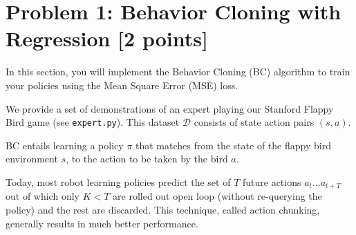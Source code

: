 \documentclass[12pt]{article}
\begin{document}
\section*{Problem 1: Behavior Cloning with Regression [2 points]}

In this section, you will implement the Behavior Cloning (BC) algorithm to train your policies using the Mean Square Error (MSE) loss.

We provide a set of demonstrations of an expert playing our Stanford Flappy Bird game (see \texttt{expert.py}). This dataset $\mathcal{D}$ consists of state action pairs $(s, a)$.

BC entails learning a policy $\pi$ that matches from the state of the flappy bird environment $s$, to the action to be taken by the bird $a$.

Today, most robot learning policies predict the set of $T$ future actions $a_{t}...a_{t+T}$ out of which only $K < T$ are rolled out open loop (without re-querying the policy) and the rest are discarded. This technique, called action chunking, generally results in much better performance.
\end{document}
